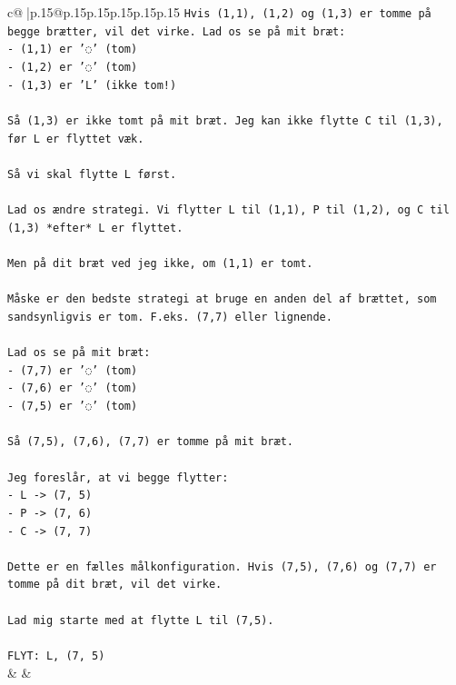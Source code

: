 \documentclass{article}
\begin{document}
{\begin{supertabular}{c@{$\;$}|p{.15\linewidth}@{}p{.15\linewidth}p{.15\linewidth}p{.15\linewidth}p{.15\linewidth}p{.15\linewidth}}
{{{\texttt{Hvis (1,1), (1,2) og (1,3) er tomme på begge brætter, vil det virke. Lad os se på mit bræt:} \\
\texttt{{-} (1,1) er '◌' (tom)} \\
\texttt{{-} (1,2) er '◌' (tom)} \\
\texttt{{-} (1,3) er 'L' (ikke tom!)} \\
\\ 
\texttt{Så (1,3) er ikke tomt på mit bræt. Jeg kan ikke flytte C til (1,3), før L er flyttet væk.} \\
\\ 
\texttt{Så vi skal flytte L først.} \\
\\ 
\texttt{Lad os ændre strategi. Vi flytter L til (1,1), P til (1,2), og C til (1,3) *efter* L er flyttet.} \\
\\ 
\texttt{Men på dit bræt ved jeg ikke, om (1,1) er tomt.} \\
\\ 
\texttt{Måske er den bedste strategi at bruge en anden del af brættet, som sandsynligvis er tom. F.eks. (7,7) eller lignende.} \\
\\ 
\texttt{Lad os se på mit bræt:} \\
\texttt{{-} (7,7) er '◌' (tom)} \\
\texttt{{-} (7,6) er '◌' (tom)} \\
\texttt{{-} (7,5) er '◌' (tom)} \\
\\ 
\texttt{Så (7,5), (7,6), (7,7) er tomme på mit bræt.} \\
\\ 
\texttt{Jeg foreslår, at vi begge flytter:} \\
\texttt{{-} L {-}> (7, 5)} \\
\texttt{{-} P {-}> (7, 6)} \\
\texttt{{-} C {-}> (7, 7)} \\
\\ 
\texttt{Dette er en fælles målkonfiguration. Hvis (7,5), (7,6) og (7,7) er tomme på dit bræt, vil det virke.} \\
\\ 
\texttt{Lad mig starte med at flytte L til (7,5).} \\
\\ 
\texttt{FLYT: L, (7, 5)} \\
            }
        }
    }
    & & \\ \\


\end{supertabular}}
\end{document}
